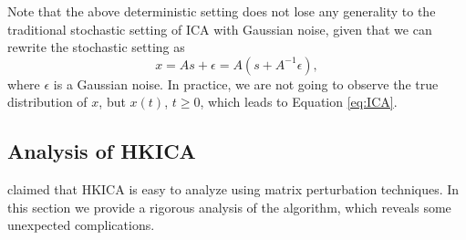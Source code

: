 \documentclass[twoside,11pt]{article}
\newcommand{\eps}{\epsilon}
\begin{document}
Note that the above deterministic setting does not lose any generality to the traditional stochastic setting of ICA with Gaussian noise, given that we can rewrite the stochastic setting as 
\[
x = As+\eps = A(s+A^{-1}\eps),
\] 
where $\eps$ is a Gaussian noise. In practice, we are not going to observe the true distribution of $x$, but $x(t)$, $t\ge 0$, which leads to Equation \eqref{eq:ICA}.
\fi


\subsection{Analysis of HKICA}
\label{sec:AnalysisHK}

\citet{hsu2013learning} claimed that HKICA is easy to analyze using matrix perturbation techniques. In this section we provide a rigorous analysis of the algorithm, which reveals some unexpected complications.
\end{document}
